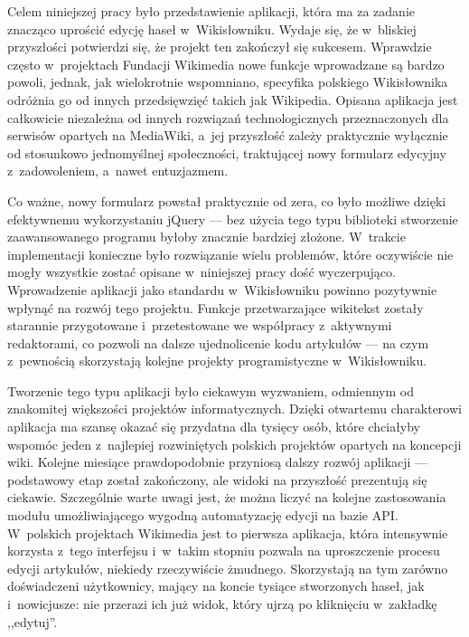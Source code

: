 Celem niniejszej pracy było przedstawienie aplikacji, która ma za zadanie znacząco uprościć edycję haseł w~Wikisłowniku. Wydaje się, że w~bliskiej przyszłości potwierdzi się, że projekt ten zakończył się sukcesem. Wprawdzie często w~projektach Fundacji Wikimedia nowe funkcje wprowadzane są bardzo powoli, jednak, jak wielokrotnie wspomniano, specyfika  polskiego Wikisłownika odróżnia go od innych przedsięwzięć takich jak Wikipedia. Opisana aplikacja jest całkowicie niezależna od innych rozwiązań technologicznych przeznaczonych dla serwisów opartych na MediaWiki, a~jej przyszłość zależy praktycznie wyłącznie od stosunkowo jednomyślnej społeczności, traktującej nowy formularz edycyjny z~zadowoleniem, a~nawet entuzjazmem.

Co ważne, nowy formularz powstał praktycznie od zera, co było możliwe dzięki efektywnemu wykorzystaniu jQuery --- bez użycia tego typu biblioteki stworzenie zaawansowanego programu byłoby znacznie bardziej złożone. W~trakcie implementacji konieczne było rozwiązanie wielu problemów, które oczywiście nie mogły wszystkie zostać opisane w~niniejszej pracy dość wyczerpująco. Wprowadzenie aplikacji jako standardu w~Wikisłowniku powinno pozytywnie wpłynąć na rozwój tego projektu. Funkcje przetwarzające wikitekst zostały starannie przygotowane i~przetestowane we współpracy z~aktywnymi redaktorami, co pozwoli na dalsze ujednolicenie kodu artykułów --- na czym z~pewnością skorzystają kolejne projekty programistyczne w~Wikisłowniku.

Tworzenie tego typu aplikacji było ciekawym wyzwaniem, odmiennym od znakomitej większości projektów informatycznych. Dzięki otwartemu charakterowi aplikacja ma szansę okazać się przydatna dla tysięcy osób, które chciałyby wspomóc jeden z~najlepiej rozwiniętych polskich projektów opartych na koncepcji wiki. Kolejne miesiące prawdopodobnie przyniosą dalszy rozwój aplikacji --- podstawowy etap został zakończony, ale widoki na przyszłość prezentują się ciekawie. Szczególnie warte uwagi jest, że można liczyć na kolejne zastosowania modułu umożliwiającego wygodną automatyzację edycji na bazie API. W~polskich projektach Wikimedia jest to pierwsza aplikacja, która intensywnie korzysta z~tego interfejsu i~w~takim stopniu pozwala na uproszczenie procesu edycji artykułów, niekiedy rzeczywiście żmudnego. Skorzystają na tym zarówno doświadczeni użytkownicy, mający na koncie tysiące stworzonych haseł, jak i~nowicjusze: nie przerazi ich już widok, który ujrzą po kliknięciu w~zakładkę ,,edytuj''.
